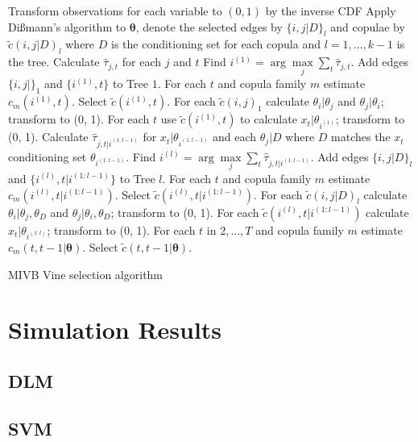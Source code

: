 \documentclass[12pt,a4paper]{article}%
\numberwithin{equation}{section}
\begin{document}
{{{{{{\begin{algorithm}[H]
 Transform observations for each variable to $(0, 1)$ by the inverse CDF\;
 Apply Di{\ss}mann's algorithm to $\boldsymbol{\theta}$, denote the selected edges by $\{i, j | D \}_l$ and copulae by $\tilde{c}(i, j | D)_l$ where $D$ is the conditioning set for each copula and $l = 1, \dots, k-1$ is the tree. \;
 Calculate $\hat{\tau}_{j, t}$ for each $j$ and $t$ \;
 Find $i^{(1)} = \arg \underset{j}{\max} \sum_t \hat{\tau}_{j, t}$. \;
 Add edges $\{i, j |\}_1$ and $\{i^{(1)}, t \}$ to Tree $1$. \;
 For each $t$ and copula family $m$ estimate $c_m(i^{(1)}, t)$.\;
 Select $\tilde{c}(i^{(1)}, t)$.\;
 For each $\tilde{c}(i, j)_1$ calculate $\theta_i | \theta_j$ and $\theta_j | \theta_i$; transform to (0, 1).\;
 For each $t$ use $\tilde{c}(i^{(1)}, t)$ to calculate $x_t | \theta_{i^{(1)}}$; transform to (0, 1).\;
  {
    Calculate $\hat{\tau}_{j, t | i^{(1:l-1)}}$ for $x_t | \theta_{i^{(1:l-1)}}$ and each $\theta_j | D$ where $D$ matches the $x_t$ conditioning set $\theta_{i^{(1:l-1)}}$. \;
  Find $i^{(l)} = \arg \underset{j}{\max} \sum_t \hat{\tau}_{j, t | i^{(1:l-1)}}$. \;
  Add edges $\{i, j | D\}_l$ and $\{i^{(l)}, t |  i^{(1:l-1)}\}$ to Tree $l$. \;
  For each $t$ and copula family $m$ estimate $c_m(i^{(l)}, t |i^{(1:l-1)})$.\;
  Select $\tilde{c}(i^{(l)}, t |i^{(1:l-1)})$.\;
  For each $\tilde{c}(i, j | D)_l$ calculate $\theta_i | \theta_j, \theta_D$ and $\theta_j | \theta_i, \theta_D$; transform to (0, 1).\;
  For each $\tilde{c}(i^{(l)}, t |i^{(1:l-1)})$ calculate $x_t | \theta_{i^{(1:l)}}$; transform to (0, 1).\;
 }
  For each $t$ in $2, \dots, T$ and copula family $m$ estimate $c_m(t, t-1 | \boldsymbol{\theta}).$ \;
  Select $\tilde{c}(t, t-1 | \boldsymbol{\theta})$. \;
   \caption{MIVB Vine selection algorithm}
  \label{alg:MIVB}
\end{algorithm}

\section{Simulation Results}
\subsection{DLM}
\subsection{SVM}

}}}}}}
\end{document}

